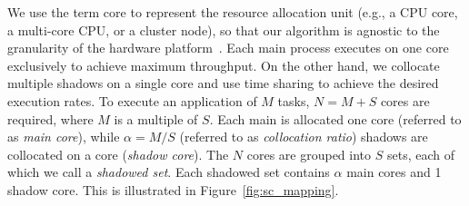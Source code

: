 We use the term core to represent the resource allocation unit (e.g., a
CPU core, a multi-core CPU, or a cluster node), so that our algorithm is agnostic to the
granularity of the hardware platform~\cite{casanova_inria_2012}. Each main process executes on one core exclusively to achieve maximum throughput.  
%
%
On the other hand, we collocate multiple shadows on a single core and use time sharing to achieve the desired execution rates.
To execute an application of $M$ tasks, $N=M+S$ cores are required, where $M$ is a multiple of $S$. Each main is allocated one core (referred to as \textit{main core}), while $\alpha=M/S$ (referred to as \textit{collocation ratio}) shadows are collocated on a core (\textit{shadow core}). 
The $N$ cores are grouped into $S$ sets, each of which we call a \textit{shadowed set}. Each shadowed set contains $\alpha$ main cores and 1 shadow core.
This is illustrated in Figure~\ref{fig:sc_mapping}.  


